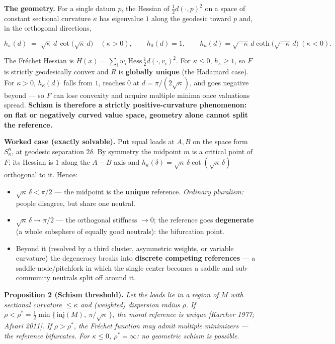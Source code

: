 \documentclass[
]{article}
\providecommand{\tightlist}{%
  \setlength{\itemsep}{0pt}\setlength{\parskip}{0pt}}
\begin{document}
\textbf{The geometry.} For a single datum \(p\), the Hessian of
\(\tfrac12 d(\cdot,p)^2\) on a space of constant sectional curvature
\(\kappa\) has eigenvalue \(1\) along the geodesic toward \(p\) and, in
the orthogonal directions,

\[ h_\kappa(d) \;=\; \sqrt{\kappa}\,d\,\cot\!\bigl(\sqrt{\kappa}\,d\bigr) \quad (\kappa>0), \qquad h_0(d)=1, \qquad h_\kappa(d)=\sqrt{-\kappa}\,d\coth\!\bigl(\sqrt{-\kappa}\,d\bigr)\ (\kappa<0). \]

The Fréchet Hessian is
\(H(x) = \sum_i w_i\,\mathrm{Hess}\,\tfrac12 d(\cdot,v_i)^2\). For
\(\kappa \le 0\), \(h_\kappa \ge 1\), so \(F\) is strictly geodesically
convex and \(R\) is \textbf{globally unique} (the Hadamard case). For
\(\kappa>0\), \(h_\kappa(d)\) falls from \(1\), reaches \(0\) at
\(d=\pi/(2\sqrt\kappa)\), and goes negative beyond --- so \(F\) can lose
convexity and acquire multiple minima once valuations spread.
\textbf{Schism is therefore a strictly positive-curvature phenomenon: on
flat or negatively curved value space, geometry alone cannot split the
reference.}

\textbf{Worked case (exactly solvable).} Put equal loads at \(A,B\) on
the space form \(S^n_\kappa\), at geodesic separation \(2\delta\). By
symmetry the midpoint \(m\) is a critical point of \(F\); its Hessian is
\(1\) along the \(A\!-\!B\) axis and
\(h_\kappa(\delta)=\sqrt\kappa\,\delta\cot(\sqrt\kappa\,\delta)\)
orthogonal to it. Hence:

\begin{itemize}
\tightlist
\item
  \(\sqrt\kappa\,\delta < \pi/2\) --- the midpoint is the
  \textbf{unique} reference. \emph{Ordinary pluralism:} people disagree,
  but share one neutral.
\item
  \(\sqrt\kappa\,\delta \to \pi/2\) --- the orthogonal stiffness
  \(\to 0\); the reference goes \textbf{degenerate} (a whole subsphere
  of equally good neutrals): the bifurcation point.
\item
  Beyond it (resolved by a third cluster, asymmetric weights, or
  variable curvature) the degeneracy breaks into \textbf{discrete
  competing references} --- a saddle-node/pitchfork in which the single
  center becomes a saddle and sub-community neutrals split off around
  it.
\end{itemize}

\textbf{Proposition 2 (Schism threshold).} \emph{Let the loads lie in a
region of \(M\) with sectional curvature \(\le \kappa\) and (weighted)
dispersion radius \(\rho\). If
\(\rho < \rho^{*} = \tfrac12\min\{\,\mathrm{inj}(M),\ \pi/\sqrt\kappa\,\}\),
the moral reference is unique {[}Karcher 1977; Afsari 2011{]}. If
\(\rho > \rho^{*}\), the Fréchet function may admit multiple minimizers
--- the reference bifurcates. For \(\kappa \le 0\),
\(\rho^{*} = \infty\): no geometric schism is possible.}
\end{document}
